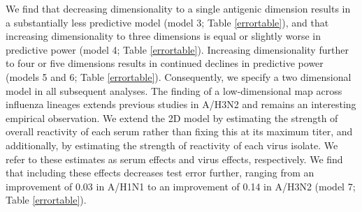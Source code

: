\documentclass[11pt,oneside,letterpaper]{article}
\begin{document}
\begin{table}[h]
	\centering
	\caption{\textbf{Average absolute prediction error of log$_2$ HI titer for test data across models and datasets.}}
	\label{errortable}	
\end{table}

We find that decreasing dimensionality to a single antigenic dimension results in a substantially less predictive model (model 3; Table \ref{errortable}), and that increasing dimensionality to three dimensions is equal or slightly worse in predictive power (model 4; Table \ref{errortable}).
Increasing dimensionality further to four or five dimensions results in continued declines in predictive power (models 5 and 6; Table \ref{errortable}).
Consequently, we specify a two dimensional model in all subsequent analyses.
The finding of a low-dimensional map across influenza lineages extends previous studies in A/H3N2 \cite{Smith04} and remains an interesting empirical observation.
We extend the 2D model by estimating the strength of overall reactivity of each serum rather than fixing this at its maximum titer, and additionally, by estimating the strength of reactivity of each virus isolate.
We refer to these estimates as serum effects and virus effects, respectively.
We find that including these effects decreases test error further, ranging from an improvement of 0.03 in A/H1N1 to an improvement of 0.14 in A/H3N2 (model 7; Table \ref{errortable}).
\end{document}
